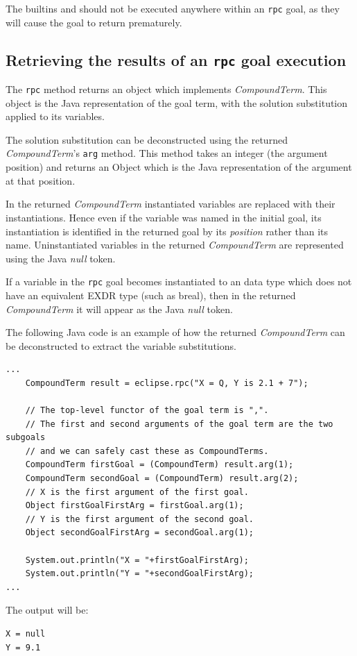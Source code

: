 The builtins  and  should not be
executed anywhere within an {\tt rpc} goal, as they will cause the
goal to return prematurely.

\subsection{Retrieving the results of an {\tt rpc} goal execution}
\label{sec:ji-rpc-return}

The {\tt rpc} method returns an object which implements {\it
CompoundTerm}. This object is the Java representation of the goal term, with
the solution substitution applied to its variables. 

The solution substitution can be deconstructed using the returned {\it
CompoundTerm}'s {\tt arg} method. This method takes an integer (the argument
position) and returns an Object which is the Java representation of
the {\eclipse} argument at that position.

In the returned {\it CompoundTerm} instantiated variables are replaced
with their instantiations. Hence even if the variable was named in the
initial goal, its instantiation is identified in the returned goal by
its {\it position} rather than its name. Uninstantiated variables in
the returned {\it CompoundTerm} are represented using the Java {\it null}
token.

If a variable in the {\tt rpc} goal becomes instantiated to an {\eclipse}
data type which does not have an equivalent EXDR type (such as breal), then
in the returned {\it CompoundTerm} it will appear as the Java {\it null}
token.

The following Java code is an example of how the returned {\it CompoundTerm}
can be deconstructed to extract the variable substitutions.
\begin{verbatim}
...
    CompoundTerm result = eclipse.rpc("X = Q, Y is 2.1 + 7");

    // The top-level functor of the goal term is ",". 
    // The first and second arguments of the goal term are the two subgoals
    // and we can safely cast these as CompoundTerms.
    CompoundTerm firstGoal = (CompoundTerm) result.arg(1);
    CompoundTerm secondGoal = (CompoundTerm) result.arg(2);
    // X is the first argument of the first goal.
    Object firstGoalFirstArg = firstGoal.arg(1);
    // Y is the first argument of the second goal.
    Object secondGoalFirstArg = secondGoal.arg(1);

    System.out.println("X = "+firstGoalFirstArg);
    System.out.println("Y = "+secondGoalFirstArg);
...
\end{verbatim}
The output will be:
\begin{verbatim}
X = null
Y = 9.1
\end{verbatim}
